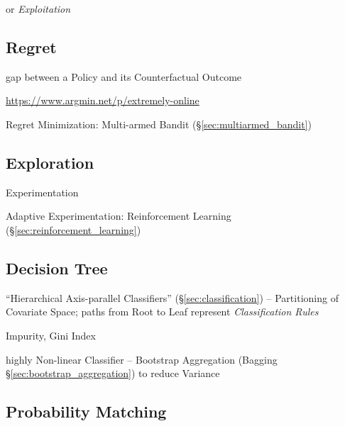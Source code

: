 or \emph{Exploitation}



\subsection{Regret}\label{sec:regret}

gap between a Policy and its Counterfactual Outcome

\url{https://www.argmin.net/p/extremely-online}

Regret Minimization: Multi-armed Bandit (\S\ref{sec:multiarmed_bandit})



\subsection{Exploration}\label{sec:exploration}

Experimentation

Adaptive Experimentation: Reinforcement Learning
(\S\ref{sec:reinforcement_learning})



\subsection{Decision Tree}\label{sec:decision_tree}

``Hierarchical Axis-parallel Classifiers'' (\S\ref{sec:classification}) --
Partitioning of Covariate Space; paths from Root to Leaf represent
\emph{Classification Rules}

Impurity, Gini Index

highly Non-linear Classifier --
Bootstrap Aggregation (Bagging \S\ref{sec:bootstrap_aggregation}) to reduce
Variance



\subsection{Probability Matching}\label{sec:probability_matching}

